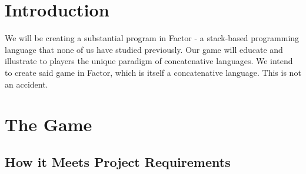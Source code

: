 \documentclass{sig-alternate}
\begin{document}



\section{Introduction}
We will be creating a substantial program in Factor - a stack-based
programming language that none of us have studied previously. 
Our game will educate and illustrate to players the
unique paradigm of concatenative languages. We intend to create
said game in Factor, which is itself a concatenative language.
This is not an accident. 

\section{The Game} \subsection{How it Meets Project Requirements}
\end{document}
